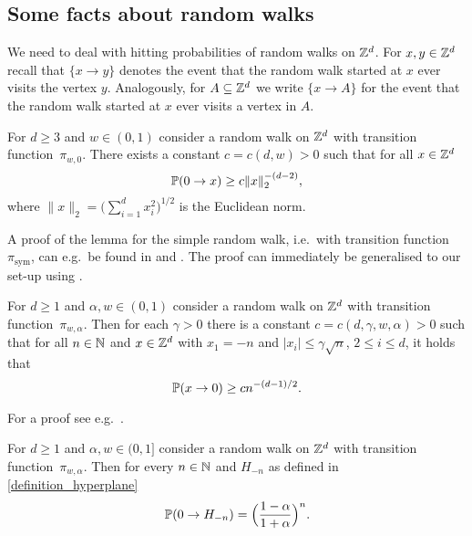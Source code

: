 
\subsection*{Some facts about random walks}

We need to deal with hitting probabilities of random walks on $\Z^d$. For $x,y \in \Z^d$ recall that $\{x\to y\}$ denotes the event that the random walk started at $x$ ever visits the vertex $y$. Analogously, for $A\subseteq \Z^d$ we write $\{x \to A\}$ for the event that the random walk started at $x$ ever visits a vertex in $A$.

\begin{lemma}\label{lemma_hitting_probability_SRW}
For $d \geq 3$ and $w \in (0,1)$ consider a random walk on $\Z^d$ with transition function~$\pi_{w,0}$. There exists a constant $c=c(d,w) >0$ such that for all $x\in \Z^d$
\begin{equation*}
\P(0\to x) \geq c \lVert x \rVert_2^{-(d-2)},
\end{equation*}
where $\lVert x \rVert_2 = \bigl(\sum_{i=1}^{d} x_i^2\bigr)^{1/2} $ is the Euclidean norm.
\end{lemma}

A proof of the lemma for the simple random walk, i.e.~with transition function $\pi_{\text{sym}}$, can e.g.~be found in \cite[Theorem~2.4]{AMP02} and \cite[Lemma~2.4]{AMP02pt}. The proof can immediately be generalised to our set-up using \cite[Theorem~2.1.3]{LL10}.

\begin{lemma}\label{lemma_hitting_probability_RW_drift}
For $d \geq 1$ and $\alpha,w \in (0,1)$ consider a random walk on $\Z^d$ with transition function~$\pi_{w,\alpha}$. Then for each $\gamma > 0$ there is a constant $c = c(d, \gamma, w, \alpha) >0$ such that for all $n \in \N$ and $x \in \Z^d$ with $x_1=-n$ and $\lvert x_i \rvert \leq \gamma\sqrt{n}$, $2 \leq i \leq d$, it holds that
\begin{equation*}
 \P(x \to 0) \geq c n^{-(d-1)/2}.
\end{equation*}
\end{lemma}

For a proof see e.g.~\cite[Lemma 3.1]{DP14}. 

\begin{lemma}\label{lemma_hitting_probability_hyperplane}
 For $d \geq 1$ and $\alpha,w \in (0,1]$ consider a random walk on $\Z^d$ with transition function~$\pi_{w,\alpha}$. Then for every $n \in \N$ and $H_{-n}$ as defined in \eqref{definition_hyperplane}
 \begin{equation*}
  \P(0\to H_{-n}) = \Bigl(\frac{1-\alpha}{1+\alpha}\Bigr)^n.
 \end{equation*}
\end{lemma}

